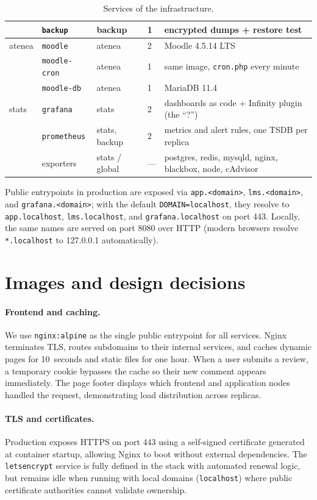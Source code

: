 \documentclass[11pt,a4paper]{article}
\newcommand{\svc}[1]{\texttt{#1}}
\begin{document}
\begin{table}[ht]
\begin{tabularx}{\textwidth}{llllY}
       & \svc{backup}      & backup  & 1 & encrypted dumps + restore test \\
\midrule
atenea & \svc{moodle}      & atenea  & 2 & Moodle 4.5.14 LTS \\
       & \svc{moodle-cron} & atenea  & 1 & same image, \texttt{cron.php} every minute \\
       & \svc{moodle-db}   & atenea  & 1 & MariaDB 11.4 \\
\midrule
stats  & \svc{grafana}     & stats   & 2 & dashboards as code + Infinity plugin (the ``?'') \\
       & \svc{prometheus}  & stats, backup & 2 & metrics and alert rules, one TSDB per replica \\
       & exporters         & stats / global & --- & postgres, redis, mysqld, nginx, blackbox, node, cAdvisor \\
\bottomrule
\end{tabularx}
\caption{Services of the infrastructure.}
\label{tab:services}
\end{table}

Public entrypoints in production are exposed via \texttt{app.<domain>}, \texttt{lms.<domain>}, and
\texttt{grafana.<domain>}; with the default \texttt{DOMAIN=localhost}, they resolve to
\texttt{app.localhost}, \texttt{lms.localhost}, and \texttt{grafana.localhost} on port 443. Locally, the same names are served on port 8080 over HTTP (modern browsers resolve \texttt{*.localhost} to 127.0.0.1 automatically).

\section{Images and design decisions}

\paragraph{Frontend and caching.} We use \texttt{nginx:alpine} as the single public entrypoint for all services. Nginx terminates TLS, routes subdomains to their internal services, and caches dynamic pages for 10~seconds and static files for one hour. When a user submits a review, a temporary cookie bypasses the cache so their new comment appears immediately. The page footer displays which frontend and application nodes handled the request, demonstrating load distribution across replicas.

\paragraph{TLS and certificates.} Production exposes HTTPS on port 443 using a self-signed certificate generated at container startup, allowing Nginx to boot without external dependencies. The \svc{letsencrypt} service is fully defined in the stack with automated renewal logic, but remains idle when running with local domains (\texttt{localhost}) where public certificate authorities cannot validate ownership.
\end{document}
